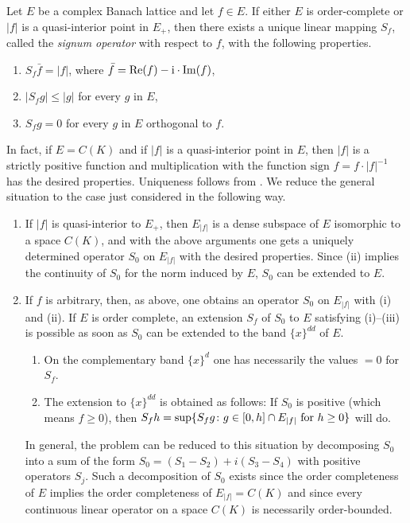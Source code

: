 Let $ E $ be a complex Banach lattice and let $ f \in E $.
If either $ E $ is order-complete or $ |f| $ is a quasi-interior point in $ E_{+} $, then there exists a unique linear mapping $ S_{f} $, called the \emph{signum operator} with respect to $ f $, with the following properties.
\begin{enumerate}[\upshape (i)]

\item  
$ S_{f}\bar{f} = |f| $, where $ \bar{f} = \mathop{}\!\mathrm{Re}(f) -  \mathrm{i} \cdot\mathop{}\!\mathrm{Im}(f) $,

\item 
$ |S_{f}g| \leq |g| $ for every $ g $ in $ E $,

\item 
$ S_{f}g = 0 $ for every $ g $ in $ E $ orthogonal to $ f $.
\end{enumerate}
In fact, if $ E = C(K) $ and if $ |f| $ is a quasi-interior point in $ E $, then $ |f| $ is a strictly positive function and multiplication with the function $ \text{sign } f = f\cdot|f|^{-1} $ has the desired properties.
Uniqueness follows from \citet[Chap. 20]{zaanen:1983}.
We reduce the general situation to the case just considered in the following way.
\begin{enumerate}[\upshape (1), wide, labelindent=.5em]

\item 
If $ |f| $ is quasi-interior to $ E_{+} $, then $ E_{|f|} $ is a dense subspace of $ E $ isomorphic to a space $ C(K) $, and with the above arguments one gets a uniquely determined operator $ S_{0} $ on $ E_{|f|} $ with the desired properties.
Since (ii) implies the continuity of $ S_{0} $ for the norm induced by $ E $, $ S_{0} $ can be extended to $ E $.

\item 
If $ f $ is arbitrary, then, as above, one obtains an operator $ S_{0} $ on $ E_{|f|} $ with (i) and (ii).
If $ E $ is order complete, an extension $ S_{f} $ of $ S_{0} $ to $ E $ satisfying (i)--(iii) is possible as soon as $ S_{0} $ can be extended to the band $ \{x\}^{dd} $ of $ E $.

\begin{enumerate}[\textbullet, labelindent=2em]
\item
On the complementary band $ \{x\}^{d} $ one has necessarily the values $ = 0 $ for $ S_{f} $.

\item
The extension to $ \{x\}^{dd} $ is obtained as follows:
If $ S_{0} $ is positive (which means $ f \geq 0 $), then 
$ S_{f}h = \sup \{ S_{f}g \colon g \in [0,h] \cap E_{|f|} \text{ for $ h \geq 0 $} \}$ will do.
\end{enumerate}
In general, the problem can be reduced to this situation by decomposing $ S_{0} $ into a sum of the form $ S_{0} = (S_{1} - S_{2}) + i(S_{3} - S_{4}) $ with positive operators $ S_{j} $.
Such a decomposition of $ S_{0} $ exists since the order completeness of $ E $ implies the order completeness of $ E_{|f|} = C(K) $ and since every continuous linear operator on a space $ C(K) $ is necessarily order-bounded.
\end{enumerate}
